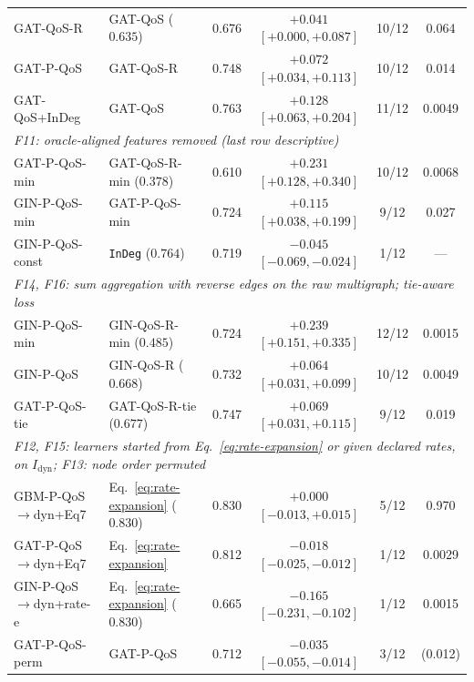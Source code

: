 \begin{table}[htbp]
{\begin{tabular}{llcccc}
GAT-QoS-R & GAT-QoS ($0.635$) & 0.676 & $+0.041$ $[+0.000, +0.087]$ & 10/12 & 0.064 \\
GAT-P-QoS & GAT-QoS-R & 0.748 & $+0.072$ $[+0.034, +0.113]$ & 10/12 & 0.014 \\
GAT-QoS+InDeg & GAT-QoS & 0.763 & $+0.128$ $[+0.063, +0.204]$ & 11/12 & 0.0049 \\
\midrule
\multicolumn{6}{l}{\textit{F11: oracle-aligned features removed (last row descriptive)}} \\
GAT-P-QoS-min & GAT-QoS-R-min ($0.378$) & 0.610 & $+0.231$ $[+0.128, +0.340]$ & 10/12 & 0.0068 \\
GIN-P-QoS-min & GAT-P-QoS-min & 0.724 & $+0.115$ $[+0.038, +0.199]$ & 9/12 & 0.027 \\
GIN-P-QoS-const & \texttt{InDeg} ($0.764$) & 0.719 & $-0.045$ $[-0.069, -0.024]$ & 1/12 & --- \\
\midrule
\multicolumn{6}{l}{\textit{F14, F16: sum aggregation with reverse edges on the raw multigraph; tie-aware loss}} \\
GIN-P-QoS-min & GIN-QoS-R-min ($0.485$) & 0.724 & $+0.239$ $[+0.151, +0.335]$ & 12/12 & 0.0015 \\
GIN-P-QoS & GIN-QoS-R ($0.668$) & 0.732 & $+0.064$ $[+0.031, +0.099]$ & 10/12 & 0.0049 \\
GAT-P-QoS-tie & GAT-QoS-R-tie ($0.677$) & 0.747 & $+0.069$ $[+0.031, +0.115]$ & 9/12 & 0.019 \\
\midrule
\multicolumn{6}{l}{\textit{F12, F15: learners started from Eq.~\eqref{eq:rate-expansion} or given declared rates, on $I_{\text{dyn}}$; F13: node order permuted}} \\
GBM-P-QoS$\to$dyn+Eq7 & Eq.~\eqref{eq:rate-expansion} ($0.830$) & 0.830 & $+0.000$ $[-0.013, +0.015]$ & 5/12 & 0.970 \\
GAT-P-QoS$\to$dyn+Eq7 & Eq.~\eqref{eq:rate-expansion} & 0.812 & $-0.018$ $[-0.025, -0.012]$ & 1/12 & 0.0029 \\
GIN-P-QoS$\to$dyn+rate-e & Eq.~\eqref{eq:rate-expansion} ($0.830$) & 0.665 & $-0.165$ $[-0.231, -0.102]$ & 1/12 & 0.0015 \\
GAT-P-QoS-perm & GAT-P-QoS & 0.712 & $-0.035$ $[-0.055, -0.014]$ & 3/12 & (0.012) \\
\bottomrule
\end{tabular}%
}
\end{table}

